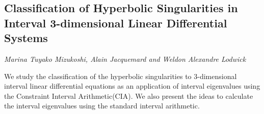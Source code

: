\documentclass[../booklet.tex]{subfiles}
\begin{document}
\subsection[Classification of Hyperbolic Singularities in Interval 3-dimensional Linear Differential Systems. {\it Marina Tuyako Mizukoshi, Alain Jacquemard and Weldon Alexandre Lodwick}]{Classification of Hyperbolic Singularities in Interval 3-dimensional Linear Differential Systems}
  

\begin{center}
  {\it Marina Tuyako Mizukoshi, Alain Jacquemard and Weldon Alexandre Lodwick}
\end{center}



We study the classification of the hyperbolic singularities to 3-dimensional interval linear differential equations as an application of  interval eigenvalues using the Constraint Interval Arithmetic(CIA). We also present the ideas to calculate the interval eigenvalues using the standard interval arithmetic.

\end{document}
